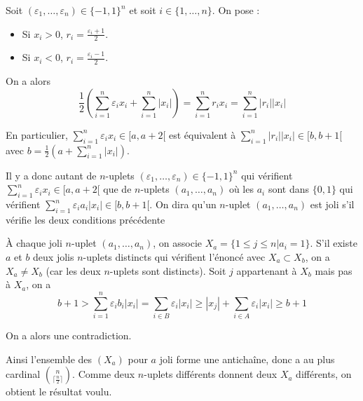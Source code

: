 Soit $(\varepsilon_1, \dots, \varepsilon_n) \in \{-1,1\}^n$ et soit $i\in \{1,\dots, n\}$. On pose :
\begin{itemize}
\item Si $x_i > 0$, $r_i=\frac{\varepsilon_i + 1}{2}$.
\item Si $x_i < 0$, $r_i=\frac{\varepsilon_i - 1}{2}$.
\end{itemize}

On a alors
$$\frac{1}{2} (\sum \limits_{i = 1}^n \varepsilon_i x_i +\sum \limits_{i = 1}^n |x_i|) = \sum \limits_{i = 1}^n r_i x_i=\sum \limits_{i = 1}^n|r_i||x_i|$$

En particulier, $\sum\limits_{i = 1}^n \varepsilon_i x_i \in [a, a + 2[$ est équivalent à $\sum\limits_{i = 1}^n |r_i| |x_i| \in [b, b + 1[$ avec $b=\frac{1}{2}(a + \sum \limits_{i = 1}^n |x_i|)$.

Il y a donc autant de $n$-uplets $(\varepsilon_1, \dots, \varepsilon_n) \in \{-1,1\}^n$ qui vérifient $\sum\limits_{i = 1}^n \varepsilon_i x_i \in [a, a+ 2[$ que de $n$-uplets $(a_1, \dots, a_n)$ où les $a_i$ sont dans $\{0, 1\}$ qui vérifient $\sum\limits_{i = 1}^n \varepsilon_i a_i |x_i|\in [b, b + 1[$. On dira qu'un $n$-uplet $(a_1, \dots, a_n)$ est joli s'il vérifie les deux conditions précédente
\smallskip

À chaque joli $n$-uplet $(a_1, \dots, a_n)$, on associe $X_a = \{1\le j \le n | a_i = 1\}$. S'il existe $a$ et $b$ deux jolis $n$-uplets distincts qui vérifient l'énoncé avec $X_a\subset X_b$, on a $X_a\neq X_b$ (car les deux $n$-uplets sont distincts). Soit $j$ appartenant à $X_b$ mais pas à $X_a$, on a
$$b + 1 > \sum\limits_{i = 1}^n \varepsilon_i b_i |x_i| = \sum\limits_{i\in B} \varepsilon_i |x_i|\ge |x_j| + \sum\limits_{i\in A}\varepsilon_i |x_i|\ge b + 1$$

On a alors une contradiction.

Ainsi l'ensemble des $(X_a)$ pour $a$ joli forme une antichaîne, donc a au plus cardinal $\binom{n}{\lceil\frac{n}{2}\rceil}$. Comme deux $n$-uplets différents donnent deux $X_a$ différents, on obtient le résultat voulu.